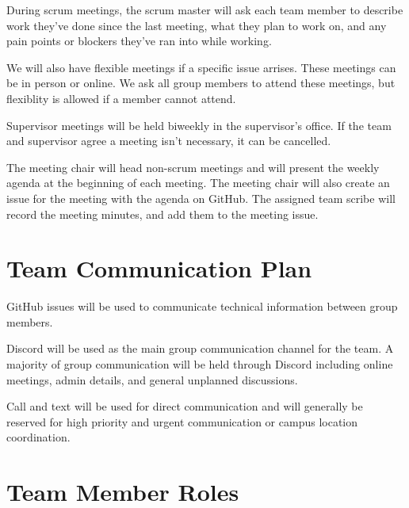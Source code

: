 \documentclass{article}
\begin{document}
During scrum meetings, the scrum master will ask each team member to describe
work they've done since the last meeting, what they plan to work on, and any
pain points or blockers they've ran into while working.\newline

We will also have flexible meetings if a specific issue arrises. These meetings can be in
person or online. We ask all group members to attend these meetings, but
flexiblity is allowed if a member cannot attend.\newline

Supervisor meetings will be held biweekly in the supervisor's office. If the
team and supervisor agree a meeting isn't necessary, it can be cancelled.
\newline

The meeting chair will head non-scrum meetings and will present the weekly
agenda at the beginning of each meeting. The meeting chair will also create an
issue for the meeting with the agenda on GitHub. The assigned team scribe will
record the meeting minutes, and add them to the meeting issue.

\section{Team Communication Plan}

GitHub issues will be used to communicate technical information 
between group members.\newline

Discord will be used as the main group communication channel for the team. A majority 
of group communication will be held through Discord including online meetings, admin details, 
and general unplanned discussions.\newline

Call and text will be used for direct communication
and will generally be reserved for high priority and urgent communication or 
campus location coordination. 

\section{Team Member Roles}
\end{document}
